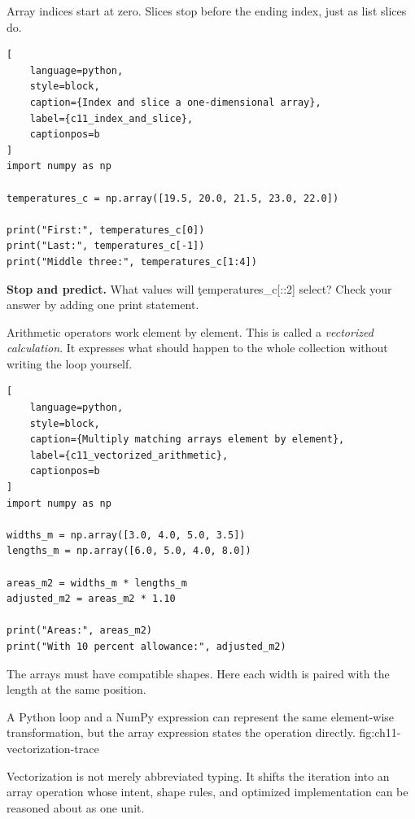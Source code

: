 
Array indices start at zero. Slices stop before the ending index, just as list
slices do.

\begin{lstlisting}[
    language=python,
    style=block,
    caption={Index and slice a one-dimensional array},
    label={c11_index_and_slice},
    captionpos=b
]
import numpy as np

temperatures_c = np.array([19.5, 20.0, 21.5, 23.0, 22.0])

print("First:", temperatures_c[0])
print("Last:", temperatures_c[-1])
print("Middle three:", temperatures_c[1:4])
\end{lstlisting}

\begin{NoteBox}
\textbf{Stop and predict.} What values will \c{temperatures_c[::2]} select?
Check your answer by adding one print statement.
\end{NoteBox}


Arithmetic operators work element by element. This is called a
\emph{vectorized calculation}. It expresses what should happen to the whole
collection without writing the loop yourself.

\begin{lstlisting}[
    language=python,
    style=block,
    caption={Multiply matching arrays element by element},
    label={c11_vectorized_arithmetic},
    captionpos=b
]
import numpy as np

widths_m = np.array([3.0, 4.0, 5.0, 3.5])
lengths_m = np.array([6.0, 5.0, 4.0, 8.0])

areas_m2 = widths_m * lengths_m
adjusted_m2 = areas_m2 * 1.10

print("Areas:", areas_m2)
print("With 10 percent allowance:", adjusted_m2)
\end{lstlisting}

The arrays must have compatible shapes. Here each width is paired with the
length at the same position.

{A Python loop and a NumPy expression can represent the same element-wise transformation, but the array expression states the operation directly.}
{fig:ch11-vectorization-trace}

Vectorization is not merely abbreviated typing. It shifts the iteration into
an array operation whose intent, shape rules, and optimized implementation can
be reasoned about as one unit.

